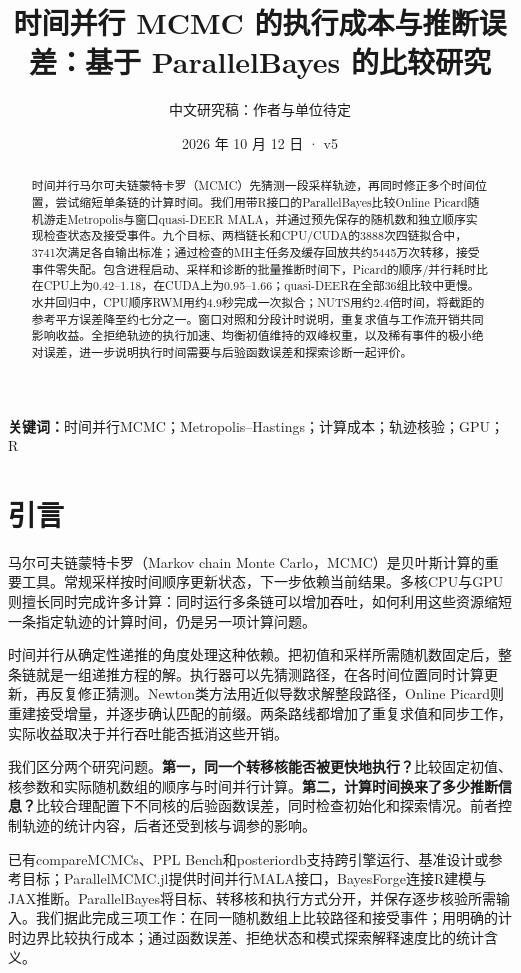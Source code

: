\documentclass[UTF8,fontset=fandol,zihao=-4]{ctexart}
\title{时间并行 MCMC 的执行成本与推断误差：基于 ParallelBayes 的比较研究}
\author{中文研究稿：作者与单位待定}
\date{2026 年 10 月 12 日 · v5}
\begin{document}
\maketitle
\begin{abstract}
时间并行马尔可夫链蒙特卡罗（MCMC）先猜测一段采样轨迹，再同时修正多个时间位置，尝试缩短单条链的计算时间。我们用带R接口的ParallelBayes比较Online Picard随机游走Metropolis与窗口quasi-DEER MALA，并通过预先保存的随机数和独立顺序实现检查状态及接受事件。九个目标、两档链长和CPU/CUDA的3888次四链拟合中，3741次满足各自输出标准；通过检查的MH主任务及缓存回放共约5445万次转移，接受事件零失配。包含进程启动、采样和诊断的批量推断时间下，Picard的顺序/并行耗时比在CPU上为0.42--1.18，在CUDA上为0.95--1.66；quasi-DEER在全部36组比较中更慢。水井回归中，CPU顺序RWM用约4.9秒完成一次拟合；NUTS用约2.4倍时间，将截距的参考平方误差降至约七分之一。窗口对照和分段计时说明，重复求值与工作流开销共同影响收益。全拒绝轨迹的执行加速、均衡初值维持的双峰权重，以及稀有事件的极小绝对误差，进一步说明执行时间需要与后验函数误差和探索诊断一起评价。
\end{abstract}
\noindent\textbf{关键词：}时间并行MCMC；Metropolis--Hastings；计算成本；轨迹核验；GPU；R

\section{引言}
马尔可夫链蒙特卡罗（Markov chain Monte Carlo，MCMC）是贝叶斯计算的重要工具。常规采样按时间顺序更新状态，下一步依赖当前结果。多核CPU与GPU则擅长同时完成许多计算：同时运行多条链可以增加吞吐，如何利用这些资源缩短一条指定轨迹的计算时间，仍是另一项计算问题。

时间并行从确定性递推的角度处理这种依赖。把初值和采样所需随机数固定后，整条链就是一组递推方程的解。执行器可以先猜测路径，在各时间位置同时计算更新，再反复修正猜测。Newton类方法用近似导数求解整段路径，Online Picard则重建接受增量，并逐步确认匹配的前缀\cite{zoltowski,grazzi}。两条路线都增加了重复求值和同步工作，实际收益取决于并行吞吐能否抵消这些开销。

我们区分两个研究问题。\textbf{第一，同一个转移核能否被更快地执行？}比较固定初值、核参数和实际随机数组的顺序与时间并行计算。\textbf{第二，计算时间换来了多少推断信息？}比较合理配置下不同核的后验函数误差，同时检查初始化和探索情况。前者控制轨迹的统计内容，后者还受到核与调参的影响。

已有compareMCMCs、PPL Bench和posteriordb支持跨引擎运行、基准设计或参考目标\cite{comparemcmcs,pplbench,posteriordb}；ParallelMCMC.jl提供时间并行MALA接口，BayesForge连接R建模与JAX推断\cite{parallelmcmc,bayesforge}。ParallelBayes将目标、转移核和执行方式分开，并保存逐步核验所需输入。我们据此完成三项工作：在同一随机数组上比较路径和接受事件；用明确的计时边界比较执行成本；通过函数误差、拒绝状态和模式探索解释速度比的统计含义。
\end{document}
